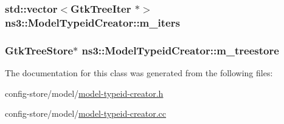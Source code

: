 \subsubsection[{\texorpdfstring{m\+\_\+iters}{m_iters}}]{\setlength{\rightskip}{0pt plus 5cm}std\+::vector$<$Gtk\+Tree\+Iter $\ast$$>$ ns3\+::\+Model\+Typeid\+Creator\+::m\+\_\+iters\hspace{0.3cm}{\ttfamily [private]}}\hypertarget{classns3_1_1ModelTypeidCreator_af4da6d8d1af7cc93c12fff92cddd4db1}{}\label{classns3_1_1ModelTypeidCreator_af4da6d8d1af7cc93c12fff92cddd4db1}
\subsubsection[{\texorpdfstring{m\+\_\+treestore}{m_treestore}}]{\setlength{\rightskip}{0pt plus 5cm}Gtk\+Tree\+Store$\ast$ ns3\+::\+Model\+Typeid\+Creator\+::m\+\_\+treestore\hspace{0.3cm}{\ttfamily [private]}}\hypertarget{classns3_1_1ModelTypeidCreator_aaf4807a0da7307b076b642f5f55c1609}{}\label{classns3_1_1ModelTypeidCreator_aaf4807a0da7307b076b642f5f55c1609}


The documentation for this class was generated from the following files\+:\begin{DoxyCompactItemize}
\item 
config-\/store/model/\hyperlink{model-typeid-creator_8h}{model-\/typeid-\/creator.\+h}\item 
config-\/store/model/\hyperlink{model-typeid-creator_8cc}{model-\/typeid-\/creator.\+cc}\end{DoxyCompactItemize}
